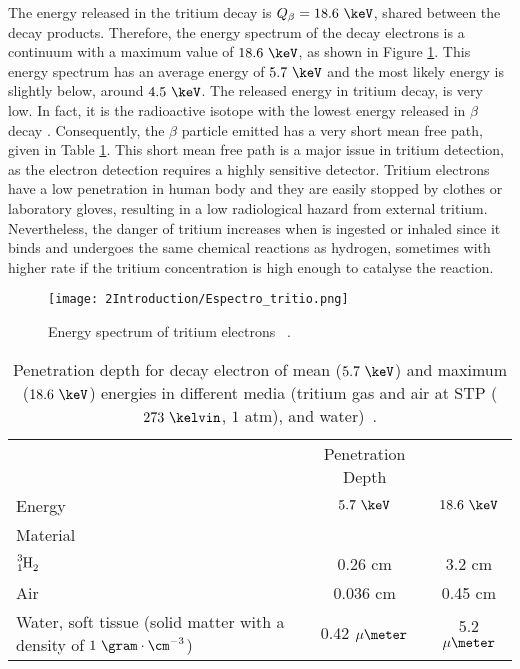 The energy released in the tritium decay is $Q_\beta=18.6~\keV$, shared between the decay products. Therefore, the energy spectrum of the decay electrons is a continuum with a maximum value of $18.6~\keV$, as shown in Figure \ref{fig:TritiumDecaySpectrum}. This energy spectrum has an average energy of $5.7~\keV$ and the most likely energy is slightly below, around $4.5~\keV$. The released energy in tritium decay, is very low. In fact, it is the radioactive isotope with the lowest energy released in $\beta$ decay \cite{TritiumHandling}. Consequently, the $\beta$ particle emitted has a very short mean free path, given in Table \ref{tab:MeanFreePathTritium}. This short mean free path is a major issue in tritium detection, as the electron detection requires a highly sensitive detector. Tritium electrons have a low penetration in human body and they are easily stopped by clothes or laboratory gloves, resulting in a low radiological hazard from external tritium. Nevertheless, the danger of tritium increases when is ingested or inhaled since it binds and undergoes the same chemical reactions as hydrogen, sometimes with higher rate if the tritium concentration is high enough to catalyse the reaction.

\begin{figure}[h]
\texttt{[image: 2Introduction/Espectro\_tritio.png]}
\centering
\caption{Energy spectrum of tritium electrons ~\cite{TritiumEspectrum}.\label{fig:TritiumDecaySpectrum}}
\end{figure}

\begin{table}[htbp]
\centering{}%
\begin{tabular}{lcc}
\toprule 
 & Penetration Depth &  \tabularnewline
Energy & $5.7~\keV$ & $18.6~\keV$ \tabularnewline
Material \tabularnewline
\midrule
\midrule 
$\ce{\ce{^{3}_{1}H_2}}$ & 0.26 cm & 3.2 cm \tabularnewline
Air & 0.036 cm & 0.45 cm \tabularnewline
\parbox{10em}{ Water, soft tissue\\  (solid matter with a \\  density of $1~\gram\cdot\cm^{-3}$)} & 0.42 $\mu\meter$ & 5.2 $\mu\meter$ \tabularnewline
\bottomrule
\end{tabular}
\caption{Penetration depth for decay electron of mean ($5.7~\keV$) and maximum ($18.6~\keV$) energies in different media (tritium gas and air at STP ($273~\kelvin$, $1$ atm), and water)~\cite{MeanFreePathDocument}.}
\label{tab:MeanFreePathTritium}
\end{table} 

